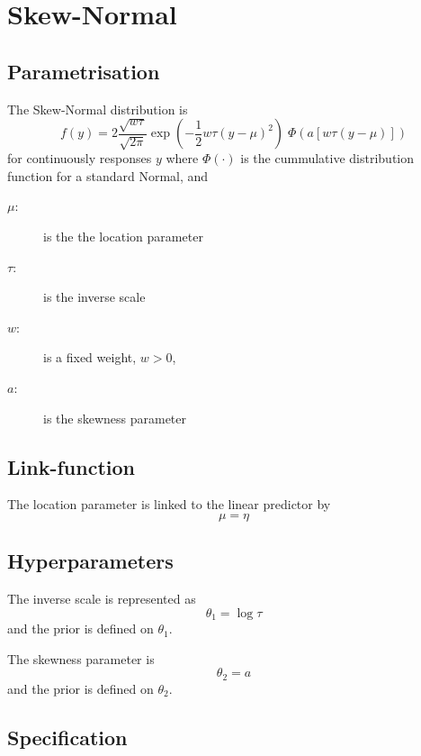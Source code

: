 \documentclass[a4paper,11pt]{article}
\begin{document}
\section*{Skew-Normal}

\subsection*{Parametrisation}

The Skew-Normal distribution is
\begin{displaymath}
    f(y) = 2\frac{\sqrt{w\tau}}{\sqrt{2\pi}} \exp\left( -\frac{1}{2}
      w\tau \left(y-\mu\right)^{2}\right) \; \Phi(a \left[w\tau \left(y-\mu\right)\right])
\end{displaymath}
for continuously responses $y$ where $\Phi(\cdot)$ is the cummulative
distribution function for a standard Normal, and
\begin{description}
\item[$\mu$:] is the the location parameter
\item[$\tau$:] is the inverse scale
\item[$w$:] is a fixed weight, $w>0$,
\item[$a$:] is the skewness parameter
\end{description}

\subsection*{Link-function}

The location parameter is linked to the linear predictor by
\begin{displaymath}
    \mu = \eta
\end{displaymath}

\subsection*{Hyperparameters}

The inverse scale is represented as
\begin{displaymath}
    \theta_{1} = \log \tau
\end{displaymath}
and the prior is defined on $\theta_{1}$. 

The skewness parameter is 
\begin{displaymath}
    \theta_{2} = a
\end{displaymath}
and the prior is defined on $\theta_{2}$. 

\subsection*{Specification}
\end{document}
